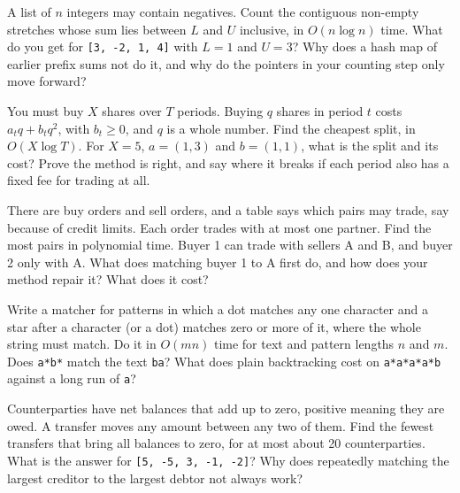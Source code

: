 \begin{question}\label{iq:iv3:algorithms:73}
A list of $n$ integers may contain negatives. Count the contiguous non-empty stretches whose sum lies between $L$ and $U$ inclusive, in $O(n \log n)$ time. What do you get for \texttt{[3, -2, 1, 4]} with $L = 1$ and $U = 3$? Why does a hash map of earlier prefix sums not do it, and why do the pointers in your counting step only move forward?
\end{question}

\begin{question}\label{iq:iv3:algorithms:74}
You must buy $X$ shares over $T$ periods. Buying $q$ shares in period $t$ costs $a_t q + b_t q^2$, with $b_t \ge 0$, and $q$ is a whole number. Find the cheapest split, in $O(X \log T)$. For $X = 5$, $a = (1, 3)$ and $b = (1, 1)$, what is the split and its cost? Prove the method is right, and say where it breaks if each period also has a fixed fee for trading at all.
\end{question}

\begin{question}\label{iq:iv3:algorithms:75}
There are buy orders and sell orders, and a table says which pairs may trade, say because of credit limits. Each order trades with at most one partner. Find the most pairs in polynomial time. Buyer 1 can trade with sellers A and B, and buyer 2 only with A. What does matching buyer 1 to A first do, and how does your method repair it? What does it cost?
\end{question}

\begin{question}\label{iq:iv3:algorithms:76}
Write a matcher for patterns in which a dot matches any one character and a star after a character (or a dot) matches zero or more of it, where the whole string must match. Do it in $O(mn)$ time for text and pattern lengths $n$ and $m$. Does \texttt{a*b*} match the text \texttt{ba}? What does plain backtracking cost on \texttt{a*a*a*a*b} against a long run of \texttt{a}?
\end{question}

\begin{question}\label{iq:iv3:algorithms:77}
Counterparties have net balances that add up to zero, positive meaning they are owed. A transfer moves any amount between any two of them. Find the fewest transfers that bring all balances to zero, for at most about 20 counterparties. What is the answer for \texttt{[5, -5, 3, -1, -2]}? Why does repeatedly matching the largest creditor to the largest debtor not always work?
\end{question}

